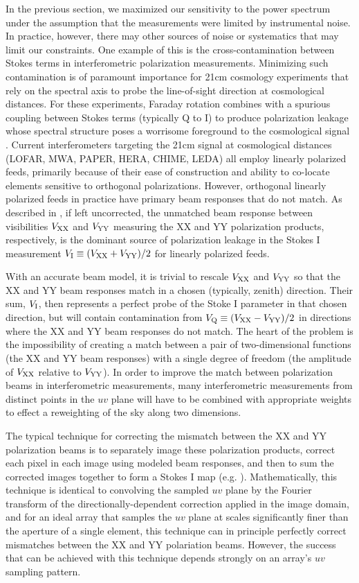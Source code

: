 \documentclass[twocolumn,apj,numberedappendix]{emulateapj}
\begin{document}
In the previous section, we maximized our sensitivity to the power spectrum under the assumption that the measurements were limited by instrumental noise. In practice, however, there may other sources of noise or systematics that may limit our constraints. One example of this is the cross-contamination between Stokes terms in interferometric polarization measurements. Minimizing such contamination is of paramount importance for 21cm cosmology experiments that rely on
the spectral axis to probe the line-of-sight direction at cosmological distances.  For these
experiments, Faraday rotation combines
with a spurious coupling between Stokes terms (typically Q to I) to produce polarization leakage whose 
spectral structure poses a worrisome foreground
to the cosmological signal \citep{jelic_et_al2008,moore_et_al2013,moore_et_al2015}.  Current interferometers
targeting the 21cm signal at cosmological distances (LOFAR, MWA, PAPER, HERA, CHIME, LEDA) all employ linearly
polarized feeds, primarily because of their ease of construction and ability to co-locate elements sensitive to
orthogonal polarizations.  However, orthogonal linearly polarized feeds in practice have primary beam responses
that do not match.  As described in \citet{moore_et_al2013}, if left uncorrected, the unmatched beam response 
between visibilities ${V_{\rm XX}}$ and ${V_{\rm YY}}$ measuring the XX and YY polarization products, respectively, is the 
dominant source of polarization leakage in the Stokes I measurement ${V_{\rm I}}\equiv({V_{\rm XX}}+{V_{\rm YY}})/2$ for
linearly polarized feeds.

With an accurate beam model, it is trivial to rescale ${V_{\rm XX}}$ and ${V_{\rm YY}}$ 
so that the XX and YY beam responses match in a chosen (typically, zenith) direction.  Their sum, ${V_{\rm I}}$, then
represents a perfect probe of the Stoke I parameter in that chosen direction, but will contain contamination
from ${V_{\rm Q}}\equiv({V_{\rm XX}}-{V_{\rm YY}})/2$ in directions where the XX and YY beam responses do not match.
The heart of the problem is the impossibility of creating a match between a pair of two-dimensional functions (the
XX and YY beam responses) with a single degree of freedom (the amplitude of ${V_{\rm XX}}$ relative to ${V_{\rm YY}}$).  In order
to improve the match between polarization beams in interferometric measurements, many interferometric measurements
from distinct points in the $uv$ plane will have to be combined with appropriate weights to effect a reweighting
of the sky along two dimensions.

The typical technique for correcting the mismatch between the XX and YY polarization beams is to separately
image these polarization products, correct each pixel in each image using modeled beam responses,
and then to sum the corrected images together to form a Stokes I map 
(e.g. \citealt{sullivan,lofar,bernardi}).  Mathematically, this technique is identical to convolving the sampled
$uv$ plane by the Fourier transform of the directionally-dependent correction applied in the image domain, and for an ideal
array that samples the $uv$ plane at scales significantly finer than the aperture of a single element, this technique can
in principle perfectly correct mismatches between the XX and YY polariation beams.
However, the success that can be achieved with this technique depends strongly on an array's $uv$ sampling pattern.
\end{document}
